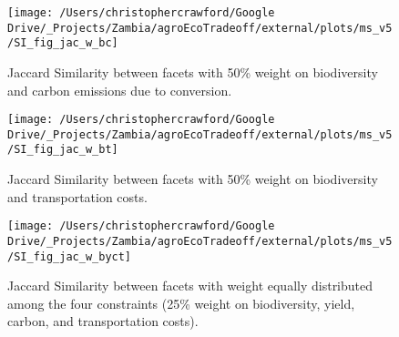 \documentclass[
]{article}
\begin{document}
\begin{figure}
\texttt{[image: /Users/christophercrawford/Google Drive/\_Projects/Zambia/agroEcoTradeoff/external/plots/ms\_v5/SI\_fig\_jac\_w\_bc]} \caption{Jaccard Similarity between facets with 50\% weight on biodiversity and carbon emissions due to conversion.}\label{fig:jac-w-bc}
\end{figure}

\begin{figure}
\texttt{[image: /Users/christophercrawford/Google Drive/\_Projects/Zambia/agroEcoTradeoff/external/plots/ms\_v5/SI\_fig\_jac\_w\_bt]} \caption{Jaccard Similarity between facets with 50\% weight on biodiversity and transportation costs.}\label{fig:jac-w-bt}
\end{figure}

\begin{figure}
\texttt{[image: /Users/christophercrawford/Google Drive/\_Projects/Zambia/agroEcoTradeoff/external/plots/ms\_v5/SI\_fig\_jac\_w\_byct]} \caption{Jaccard Similarity between facets with weight equally distributed among the four constraints (25\% weight on biodiversity, yield, carbon, and transportation costs).}\label{fig:jac-w-byct}
\end{figure}
\end{document}

